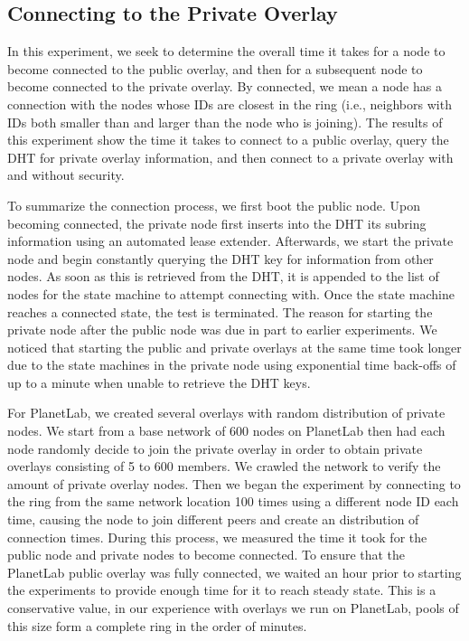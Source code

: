 \documentclass[conference]{IEEEtran}
\begin{document}
\subsection{Connecting to the Private Overlay}
In this experiment, we seek to determine the overall time
it takes for a node to become connected to the public overlay, and then for a
subsequent node to become connected to the private overlay.  By connected, we
mean a node has a connection with the nodes whose IDs are closest in the ring (i.e., neighbors with IDs both smaller
than and larger than the node who is joining).  The results of this experiment
show the time it takes to connect to a public overlay, query the DHT for private overlay
information, and then connect to a private overlay with and without security.

To summarize the connection process, we first boot the public node.  Upon
becoming connected, the private node first inserts into the DHT its 
subring information using an automated lease extender.  Afterwards, we
start the private node and begin constantly querying the DHT key for information
from other nodes.  As soon as this is retrieved from the DHT, it is appended to the list of
nodes for the state machine to attempt connecting with.  Once the state machine
reaches a connected state, the test is terminated.  The reason for starting
the private node after the public node was due in part to earlier experiments.
We noticed that starting the public and private overlays at the same time took
longer due to the state machines in the private node using exponential time
back-offs of up to a minute when unable to retrieve the DHT keys.

For PlanetLab, we created several overlays with random distribution of private
nodes.  We start from a base network of
600 nodes on PlanetLab then had each node randomly decide to join the private
overlay in order to obtain private overlays consisting of 5 to 600 members.  We
crawled the network to verify the amount of private overlay nodes.  Then we began
the experiment by connecting to the ring from the same network location 100 times
using a different node ID each time, causing the node to join different peers and
create an distribution of connection times. During this process, we measured the time it
took for the public node and private nodes to become connected.  To ensure that
the PlanetLab public overlay was fully connected, we waited an hour prior to starting the
experiments to provide enough time for it to reach steady state. This is a conservative
value, in our experience with overlays we run on PlanetLab, pools of this size form a complete
ring in the order of minutes.
\end{document}
